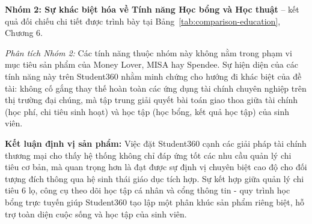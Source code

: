 \textbf{Nhóm 2: Sự khác biệt hóa về Tính năng Học bổng và Học thuật} -- kết quả đối chiếu chi tiết được trình bày tại Bảng~\ref{tab:comparison-education}, Chương 6.

\textit{Phân tích Nhóm 2:} Các tính năng thuộc nhóm này không nằm trong phạm vi mục tiêu sản phẩm của Money Lover, MISA hay Spendee. Sự hiện diện của các tính năng này trên Student360 nhằm minh chứng cho hướng đi khác biệt của đề tài: không cố gắng thay thế hoàn toàn các ứng dụng tài chính chuyên nghiệp trên thị trường đại chúng, mà tập trung giải quyết bài toán giao thoa giữa tài chính (học phí, chi tiêu sinh hoạt) và học tập (học bổng, kết quả học tập) của sinh viên.

\textbf{Kết luận định vị sản phẩm:} Việc đặt Student360 cạnh các giải pháp tài chính thương mại cho thấy hệ thống không chỉ đáp ứng tốt các nhu cầu quản lý chi tiêu cơ bản, mà quan trọng hơn là đạt được sự định vị chuyên biệt cao độ cho đối tượng đích thông qua hệ sinh thái giáo dục tích hợp. Sự kết hợp giữa quản lý chi tiêu 6 lọ, công cụ theo dõi học tập cá nhân và cổng thông tin - quy trình học bổng trực tuyến giúp Student360 tạo lập một phân khúc sản phẩm riêng biệt, hỗ trợ toàn diện cuộc sống và học tập của sinh viên.


